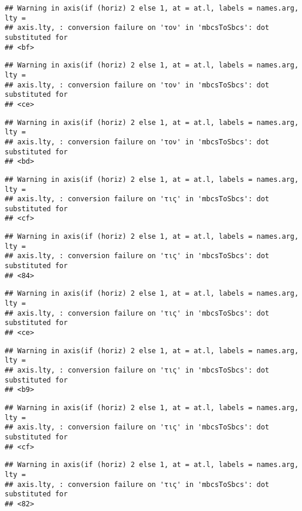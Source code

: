 \documentclass[
]{article}
\begin{document}
\begin{verbatim}
## Warning in axis(if (horiz) 2 else 1, at = at.l, labels = names.arg, lty =
## axis.lty, : conversion failure on 'τον' in 'mbcsToSbcs': dot substituted for
## <bf>
\end{verbatim}

\begin{verbatim}
## Warning in axis(if (horiz) 2 else 1, at = at.l, labels = names.arg, lty =
## axis.lty, : conversion failure on 'τον' in 'mbcsToSbcs': dot substituted for
## <ce>
\end{verbatim}

\begin{verbatim}
## Warning in axis(if (horiz) 2 else 1, at = at.l, labels = names.arg, lty =
## axis.lty, : conversion failure on 'τον' in 'mbcsToSbcs': dot substituted for
## <bd>
\end{verbatim}

\begin{verbatim}
## Warning in axis(if (horiz) 2 else 1, at = at.l, labels = names.arg, lty =
## axis.lty, : conversion failure on 'τις' in 'mbcsToSbcs': dot substituted for
## <cf>
\end{verbatim}

\begin{verbatim}
## Warning in axis(if (horiz) 2 else 1, at = at.l, labels = names.arg, lty =
## axis.lty, : conversion failure on 'τις' in 'mbcsToSbcs': dot substituted for
## <84>
\end{verbatim}

\begin{verbatim}
## Warning in axis(if (horiz) 2 else 1, at = at.l, labels = names.arg, lty =
## axis.lty, : conversion failure on 'τις' in 'mbcsToSbcs': dot substituted for
## <ce>
\end{verbatim}

\begin{verbatim}
## Warning in axis(if (horiz) 2 else 1, at = at.l, labels = names.arg, lty =
## axis.lty, : conversion failure on 'τις' in 'mbcsToSbcs': dot substituted for
## <b9>
\end{verbatim}

\begin{verbatim}
## Warning in axis(if (horiz) 2 else 1, at = at.l, labels = names.arg, lty =
## axis.lty, : conversion failure on 'τις' in 'mbcsToSbcs': dot substituted for
## <cf>
\end{verbatim}

\begin{verbatim}
## Warning in axis(if (horiz) 2 else 1, at = at.l, labels = names.arg, lty =
## axis.lty, : conversion failure on 'τις' in 'mbcsToSbcs': dot substituted for
## <82>
\end{verbatim}
\end{document}
